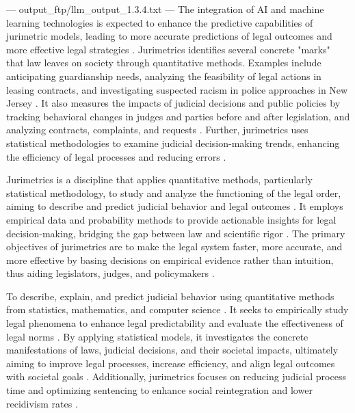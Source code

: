---
output_ftp/llm_output_1.3.4.txt
---
The integration of AI and machine learning technologies is expected to enhance the predictive capabilities of jurimetric models, leading to more accurate predictions of legal outcomes and more effective legal strategies \cite{10.1007/s11186-021-09453-1,10.5040/9781350220645}. Jurimetrics identifies several concrete "marks" that law leaves on society through quantitative methods. Examples include anticipating guardianship needs, analyzing the feasibility of legal actions in leasing contracts, and investigating suspected racism in police approaches in New Jersey \cite{zabala1809}. It also measures the impacts of judicial decisions and public policies by tracking behavioral changes in judges and parties before and after legislation, and analyzing contracts, complaints, and requests \cite{nunes2018_72-73}. Further, jurimetrics uses statistical methodologies to examine judicial decision-making trends, enhancing the efficiency of legal processes and reducing errors \cite{massuanganhe2016_26-27, nunes2018_75-75}.

Jurimetrics is a discipline that applies quantitative methods, particularly statistical methodology, to study and analyze the functioning of the legal order, aiming to describe and predict judicial behavior and legal outcomes \cite{nunes2018, massuanganhe2016, loevinger1949}. It employs empirical data and probability methods to provide actionable insights for legal decision-making, bridging the gap between law and scientific rigor \cite{nunes2018, de2010}. The primary objectives of jurimetrics are to make the legal system faster, more accurate, and more effective by basing decisions on empirical evidence rather than intuition, thus aiding legislators, judges, and policymakers \cite{nunes2018, loevinger1949, zabala1809}.

To describe, explain, and predict judicial behavior using quantitative methods from statistics, mathematics, and computer science \cite{luvizotto2020, nunes2018}. It seeks to empirically study legal phenomena to enhance legal predictability and evaluate the effectiveness of legal norms \cite{nunes2018, de2010}. By applying statistical models, it investigates the concrete manifestations of laws, judicial decisions, and their societal impacts, ultimately aiming to improve legal processes, increase efficiency, and align legal outcomes with societal goals \cite{massuanganhe2016, luvizotto2020}. Additionally, jurimetrics focuses on reducing judicial process time and optimizing sentencing to enhance social reintegration and lower recidivism rates \cite{nunes2018}.

